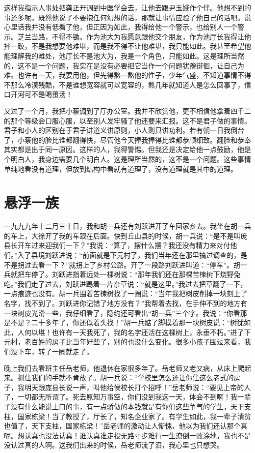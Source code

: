 \documentclass[12pt,oneside]{book}
\begin{document}
这样我指示人事处把龚正开调到中医学会去，让他去跟尹玉娥作个伴。他想不到的事还多呢。既然他说了不要抱任何幻想的话，那就让事情应验了他自己的话吧。说心里话我并没有低看了他，但正因为如此，我得给他一个警示，也给别人一个警示。芝兰当路，不得不锄。作为池大为我愿意跟他交个朋友，作为池厅长我得让他摔一跤，不是我想要他难堪，而是我不得不让他难堪，我只能如此。我甚至希望他能理解我的难处，池厅长不是池大为，我是一个角色，只能如此。这是理所当然的，这不是一个问题，我实在是没有必要把它当作一个问题犹豫徘徊，让自己为难。也许有一天，我要用他，但先得熬一熬他的性子，少年气盛，不知道事情不得不那么冷漠残酷，不是谁想宽容就可以宽容的，熬几年就知道人是怎么回事了，信口开河可不是喝蛋汤！

又过了一个月，我把小蔡调到了厅办公室。我并不欣赏他，更不相信他拿着四千二的那个等级会口服心服，以至别人发牢骚了他还要来汇报。这不是君子做的事情。君子和小人的区别在于君子讲道义讲原则，小人则只讲功利。若有朝一日我倒台了，小蔡他的脸比谁都翻得快，尽管他今天捧我捧得比谁都恭顺细致。翻脸和恭奉其实都是出于同一原因。这样的人，我得警惕。但我还是决定给他一点鼓励，他是个明白人，我身边需要几个明白人。这是理所当然的，这不是一个问题。这些事情单纯地看没有道理，但放到结构中看就有道理了，没有道理就是其中的道理。


\chapter{悬浮一族}
一九九九年十二月三十日，我和胡一兵还有刘跃进开了车回家乡去。我坐在胡一兵的车上，大徐开了我的车跟在后面。快到丘山县的时候，胡一兵说：``是不是叫庞县长开车过来迎我们一下？''我说：``算了，摆什么摆？我还没有精力来对付他们。''入了县境刘跃进说：``前面就是下元村了，我们当年还在那里搞过调查的，是不是拐过去看一下？''就拐上了乡村公路。开了一段路刘跃进叫道：``停车''。胡一兵就把车停了。刘跃进指着远处一棵树说：``那年我们还在那棵苦楝树下烧野兔吃。''我们走了过去，刘跃进踢着一片杂草说：``就是这里。''我过去把草翻了一下，一点痕迹也没有。胡一兵围着苦楝树找了一圈说：``当年我把树皮削掉一块刻上了名字，找不到了。刘跃进你记错了地方没有？''我帮着去找，在手伸不到的地方有一块树皮光滑一些，我仔细看了，隐约还可看出``胡一兵''三个字。我说：``你看那是不是？二十多年了，你还低着头找！''胡一兵踮了脚摸着那一块树皮说：``树犹如此，人何以堪！也许有一天我死了，我的名字还活在这棵树上，永垂不朽。''进了下元村，老百姓的房子比当年好些了，别的也没什么变化。很多小孩子围过来看，我们没下车，转了一圈就走了。

晚上我们去看班主任岳老师，他退休在家很多年了。岳老师又老又病，从床上爬起来。抓住我们的手就不肯放了。胡一兵说：``学校里怎么还让你住这么老式的房子，我明天跟庞县长说一声，叫他给侯校长打个招呼！''岳老师说：``要见上帝的人了，一切都无所谓了。死去原知万事空，你们没到我这一天，体会不到啊！我一辈子没有什么能说上口的事，有一点骄傲的本钱就是有你们这些争气的学生，天下支柱，国家栋梁！当了教授了，厅长了，知名企业家了。有学生如此，我一辈子清贫也值了，天下支柱，国家栋梁！''岳老师的激动让人惭愧，他以为我们还认那个真呢。想认真也没法认真！谁认真谁走投无路寸步难行一生潦倒一败涂地，我也不是没认过真的人啊。送我们出来的时候，岳老师流了泪，我心里也只想哭。
\end{document}
